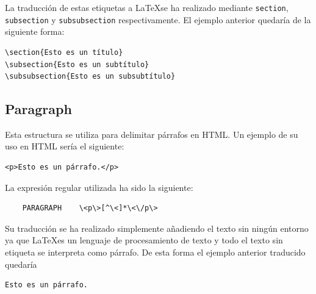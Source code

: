\documentclass[12pt]{article}
\begin{document}
La traducción de estas etiquetas a \LaTeX se ha realizado mediante \verb|section|, \verb|subsection| y \verb|subsubsection| respectivamente. El ejemplo anterior quedaría de la siguiente forma:
\begin{verbatim}
\section{Esto es un título}
\subsection{Esto es un subtítulo}
\subsubsection{Esto es un subsubtítulo}
\end{verbatim}

\subsection{Paragraph}
Esta estructura se utiliza para delimitar párrafos en HTML. Un ejemplo de su uso en HTML sería el siguiente:
\begin{verbatim}
<p>Esto es un párrafo.</p>
\end{verbatim}
La expresión regular utilizada ha sido la siguiente:
\begin{verbatim}
    PARAGRAPH    \<p\>[^\<]*\<\/p\>
\end{verbatim}
Su traducción se ha realizado simplemente añadiendo el texto sin ningún entorno ya que \LaTeX es un lenguaje de procesamiento de texto y todo el texto sin etiqueta se interpreta como párrafo. De esta forma el ejemplo anterior traducido quedaría
\begin{verbatim}
Esto es un párrafo.
\end{verbatim}
\end{document}
